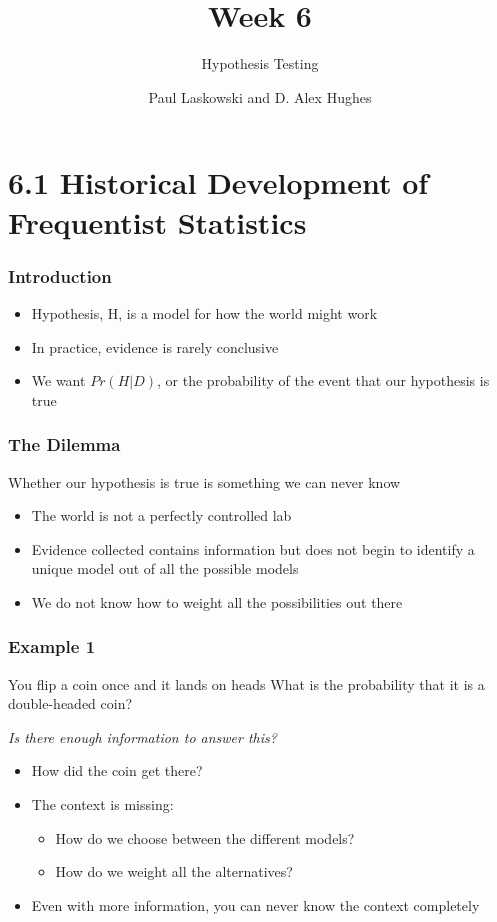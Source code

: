 \documentclass[12pt, block=fill]{beamer}
\title{Week 6}
\subtitle{Hypothesis Testing}
\author{Paul Laskowski and D. Alex Hughes}
\institute{UC Berkeley, School of Information}
\begin{document}
\begin{frame}
  \maketitle
\end{frame}

\section{6.1 Historical Development of Frequentist Statistics}
\begin{frame}
  \frametitle{Introduction}
  \begin{itemize}
    \item Hypothesis, H, is a model for how the world might work
    \item In practice, evidence is rarely conclusive
    \item We want $Pr(H|D)$, or the probability of the event that our hypothesis is true
  \end{itemize}
\end{frame}


\begin{frame}
  \frametitle{The Dilemma}
     Whether our hypothesis is true is something we can never know 
  \begin{itemize}
    \item The world is not a perfectly controlled lab
    \item Evidence collected contains information but does not begin to identify a unique model out of all the possible models
    \item We do not know how to weight all the possibilities out there
 \end{itemize}
\end{frame}

\begin{frame}
  \frametitle{Example 1}
  \begin{exampleblock}{You flip a coin once and it lands on heads}
    What is the probability that it is a double-headed coin?
  \end{exampleblock}
  \textit{Is there enough information to answer this?}
  \begin{itemize}
    \item How did the coin get there?
    \item The context is missing:
    \begin{itemize}
        \item How do we choose between the different models?
        \item How do we weight all the alternatives?
    \end{itemize}  
    \item Even with more information, you can never know the context completely
  \end{itemize}
\end{frame}
\end{document}
